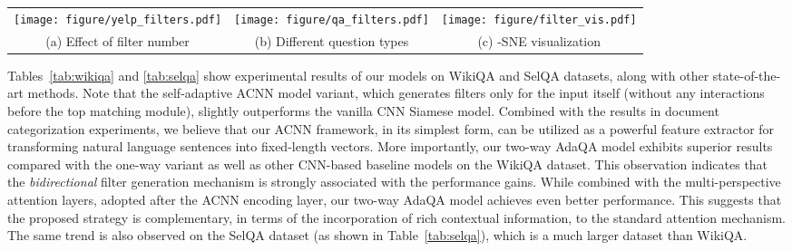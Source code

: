 \documentclass[11pt,a4paper]{article}
\begin{document}
\begin{figure*} \centering
	\vspace{-2mm}
	\begin{tabular}{ccc}  
		\texttt{[image: figure/yelp\_filters.pdf]} & \hspace{-2mm}
		\texttt{[image: figure/qa\_filters.pdf]} &  \hspace{-2mm}
		\texttt{[image: figure/filter\_vis.pdf]} 
		\\
		\hspace{-0mm}
		(a) Effect of filter number \vspace{0mm}  & 
		\hspace{-0mm}
		(b) Different question types \hspace{-0mm}& 
		(c) -SNE visualization  \hspace{-0mm}
\end{tabular}
	\vspace{-3mm}
	\caption{\small Comprehensive study of the proposed ACNN framework, including (a) the number of filters (Yelp dataset), and (b) performance \emph{vs} question types (WikiQA dataset), and (c) -SNE visualization of learned filter weights (DBpedia dataset).}
	\vspace{-4mm}
	\label{fig:study}
\end{figure*}

Tables~\ref{tab:wikiqa} and \ref{tab:selqa} show experimental results of our models on WikiQA and SelQA datasets, along with other state-of-the-art methods. Note that the self-adaptive ACNN model variant, which generates filters only for the input itself (without any interactions before the top matching module), slightly outperforms the vanilla CNN Siamese model. Combined with the results in document categorization experiments, we believe that our ACNN framework, in its simplest form, can be utilized as a powerful feature extractor for transforming natural language sentences into fixed-length vectors. 
More importantly, our two-way AdaQA model exhibits superior results compared with the one-way variant as well as other CNN-based baseline models on the WikiQA dataset. This observation indicates that the \emph{bidirectional} filter generation mechanism is strongly associated with the performance gains. 
While combined with the multi-perspective attention layers, adopted after the ACNN encoding layer, our two-way AdaQA model achieves even better performance. This suggests that the proposed strategy is complementary, in terms of the incorporation of rich contextual information, to the standard attention mechanism.  The same trend is also observed on the SelQA dataset (as shown in Table~\ref{tab:selqa}), which is a much larger dataset than WikiQA. 
\end{document}
